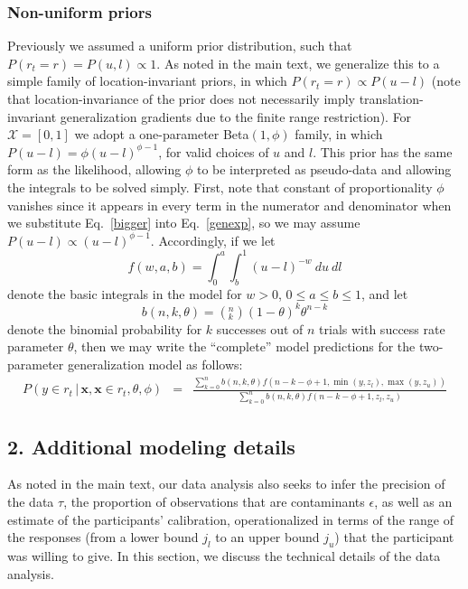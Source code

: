 \documentclass[doc]{apa6}
\newcommand{\p}{P}
\newcommand{\xn}{{\bm{x}}}
\newcommand{\rt}{{r_t}}
\newcommand{\condon}{\, | \,}
\begin{document}
\subsubsection{Non-uniform priors} Previously we assumed a uniform prior distribution, such that $\p(\rt=r)= \p(u,l)  \propto 1$. As noted in the main text, we generalize this to a simple family of location-invariant priors, in which $\p(\rt=r) \propto \p(u-l)$ (note that location-invariance of the prior does not necessarily imply translation-invariant generalization gradients due to the finite range restriction). For $\mathcal{X}=[0,1]$ we adopt a one-parameter Beta$(1,\phi)$ family, in which $\p(u-l) = \phi (u-l)^{\phi-1}$, for valid choices of $u$ and $l$. This prior has the same form as the likelihood, allowing $\phi$ to be interpreted as pseudo-data and allowing the integrals to be solved simply. First, note that constant of proportionality $\phi$ vanishes since it appears in every term in the numerator and denominator when we substitute Eq.~\ref{bigger} into Eq.~\ref{genexp}, so we may assume $\p(u-l) \propto (u-l)^{\phi-1}$. Accordingly, if we let
\begin{equation}
f(w,a,b) = \int_0^{a} \int_{b}^1 (u-l)^{-w} \ du \ dl
\end{equation}
denote the basic integrals in the model for $w>0$, $0 \leq a \leq b \leq 1$, and let
\begin{equation}
b(n,k,\theta) = \left(^n_k\right) (1-\theta)^k \theta^{n-k}
\end{equation}
denote the binomial probability for $k$ successes out of $n$ trials with success rate parameter $\theta$, then we may write the ``complete'' model predictions for the two-parameter generalization model as follows:
\begin{eqnarray}
\p(y \in \rt \condon  \xn, \xn \in \rt, \theta, \phi) &=& \frac{\sum_{k=0}^n b(n,k,\theta) f(n-k-\phi+1,\min(y,z_l),\max(y,z_u))}{\sum_{k=0}^n b(n,k,\theta) f(n-k-\phi+1,z_l,z_u)} \label{last}
\end{eqnarray}



\subsection{2. Additional modeling details}

As noted in the main text, our data analysis also seeks to infer the precision of the data $\tau$, the proportion of observations that are contaminants $\epsilon$, as well as an estimate of the participants' calibration, operationalized in terms of the range of  the responses (from a lower bound $j_l$ to an upper bound $j_u$) that the participant was willing to give. In this section, we discuss the technical details of the data analysis.
\end{document}
